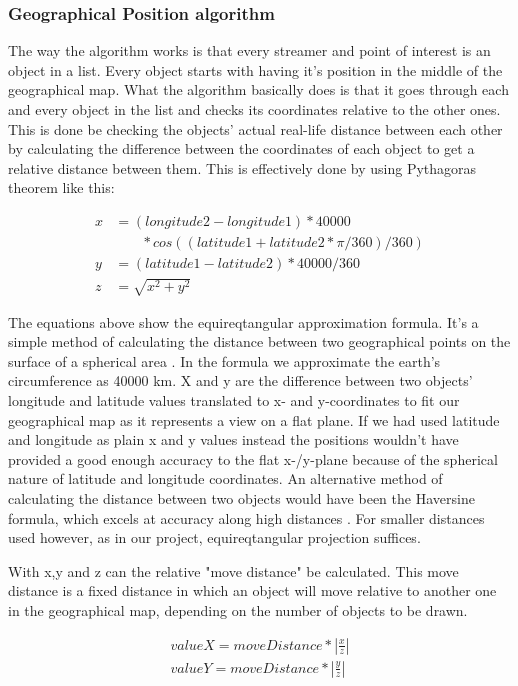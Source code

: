 \documentclass[9pt,a4paper]{acmproc}
\begin{document}
\subsubsection{Geographical Position algorithm}
The way the algorithm works is that every streamer and point of interest is an object in a list. Every object starts with having it's position in the middle of the geographical map. What the algorithm basically does is that it goes through each and every object in the list and checks its coordinates relative to the other ones. This is done be checking the objects' actual real-life distance between each other by calculating the difference between the coordinates of each object to get a relative distance between them. This is effectively done by using Pythagoras theorem like this:

\begin{align*}
x &= (longitude2-longitude1)*40000  \\
 &\phantom{b=\,} *cos((latitude1+latitude2 * \pi/360)/360) \nonumber \\
y &= (latitude1-latitude2)*40000/360 \\
z &= \sqrt{x^2+y^2}
\end{align*}

The equations above show the equireqtangular approximation formula. It's a simple method of calculating the distance between two geographical points on the surface of a spherical area \cite[s.~5]{equi}. In the formula we approximate the earth's circumference as 40000 km. X and y are the difference between two objects' longitude and latitude values translated to x- and y-coordinates to fit our geographical map as it represents a view on a flat plane. If we had used latitude and longitude as plain x and y values instead the positions wouldn't have provided a good enough accuracy to the flat x-/y-plane because of the spherical nature of latitude and longitude coordinates. An alternative method of calculating the distance between two objects would have been the Haversine formula, which excels at accuracy along high distances \cite{haversine}. For smaller distances used however, as in our project, equireqtangular projection suffices.

With x,y and z can the relative "move distance" be calculated. This move distance is a fixed distance in which an object will move relative to another one in the geographical map, depending on the number of objects to be drawn.

\begin{align*}
\label{eq:2}
valueX = moveDistance*|\frac{x}{z}| \\
valueY = moveDistance*|\frac{y}{z}|
\end{align*}
\end{document}

